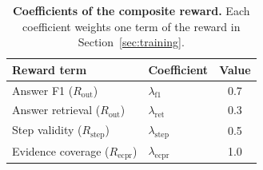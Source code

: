 \begin{table}[t]
\centering
\small
\begin{tabular}{llc}
\toprule
\textbf{Reward term} & \textbf{Coefficient} & \textbf{Value} \\
\midrule
Answer F1 ($R_{\text{out}}$)          & $\lambda_{\text{f1}}$   & 0.7 \\
Answer retrieval ($R_{\text{out}}$)   & $\lambda_{\text{ret}}$  & 0.3 \\
Step validity ($R_{\text{step}}$)     & $\lambda_{\text{step}}$ & 0.5 \\
Evidence coverage ($R_{\text{ecpr}}$) & $\lambda_{\text{ecpr}}$ & 1.0 \\
\bottomrule
\end{tabular}
\caption{\textbf{Coefficients of the composite reward.} Each coefficient weights one term of the reward in Section~\ref{sec:training}.}
\label{tab:reward_weights}
\end{table}
